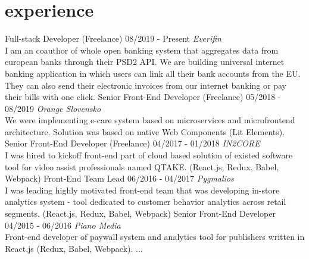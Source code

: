 \documentclass[a4paper]{cv}
\begin{document}
\section{experience}
\begin{entrylist}
	\entry
		{Full-stack Developer (Freelance)}
		{08/2019 - Present}
		{\emph{Everifin}\\
		I am an coauthor of whole open banking system that aggregates data from european banks through their PSD2 API. We are building universal internet banking application in which users can link all their bank accounts from the EU. They can also send their electronic invoices from our internet banking or pay their bills with one click.}
	\entry
		{Senior Front-End Developer (Freelance)}
		{05/2018 - 08/2019}
		{\emph{Orange Slovensko}\\
		We were implementing e-care system based on microservices and microfrontend architecture. Solution was based on native Web Components (Lit Elements).}
	\entry
		{Senior Front-End Developer (Freelance)}
		{04/2017 - 01/2018}
		{\emph{IN2CORE}\\
		I was hired to kickoff front-end part of cloud based solution of existed software tool for video assist professionals named QTAKE. (React.js, Redux, Babel, Webpack)}
	\entry
		{Front-End Team Lead}
		{06/2016 - 04/2017}
		{\emph{Pygmalios}\\
		I was leading highly motivated front-end team that was developing in-store analytics system - tool dedicated to customer behavior analytics across retail segments. (React.js, Redux, Babel, Webpack)}
	\entry
		{Senior Front-End Developer}
		{04/2015 - 06/2016}
		{\emph{Piano Media}\\
		Front-end developer of paywall system and analytics tool for publishers written in React.js (Redux, Babel, Webpack).}
	...
\end{entrylist}
\end{document}
